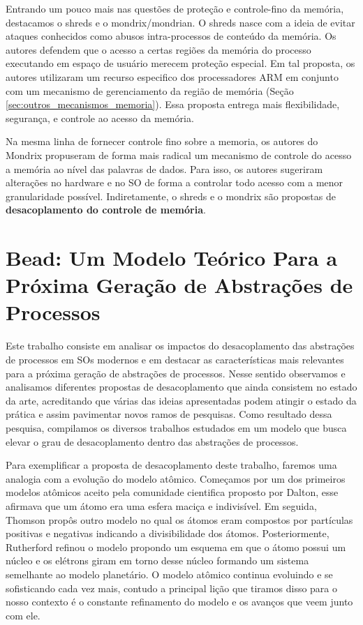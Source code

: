 Entrando um pouco mais nas questões de proteção e controle-fino da memória,
destacamos o shreds e o mondrix/mondrian. O shreds nasce com a ideia de evitar
ataques conhecidos como abusos intra-processos de conteúdo da memória.  Os
autores defendem que o acesso a certas regiões da memória do processo
executando em espaço de usuário merecem proteção especial. Em tal proposta, os
autores utilizaram um recurso especifico dos processadores ARM em conjunto com
um mecanismo de gerenciamento da região de memória (Seção
\ref{sec:outros_mecanismos_memoria}). Essa proposta entrega mais flexibilidade,
segurança, e controle ao acesso da memória.

Na mesma linha de fornecer controle fino sobre a memoria, os autores do Mondrix
propuseram de forma mais radical um mecanismo de controle do acesso a memória
ao nível das palavras de dados. Para isso, os autores sugeriram alterações no
hardware e no SO de forma a controlar todo acesso com a menor granularidade
possível. Indiretamente, o shreds e o mondrix são propostas de
\textbf{desacoplamento do controle de memória}.

\section{Bead: Um Modelo Teórico Para a Próxima Geração de Abstrações de Processos}

Este trabalho consiste em analisar os impactos do desacoplamento das abstrações
de processos em SOs modernos e em destacar as características mais relevantes
para a próxima geração de abstrações de processos. Nesse sentido observamos e
analisamos diferentes propostas de desacoplamento que ainda consistem no estado
da arte, acreditando que várias das ideias apresentadas podem atingir o estado
da prática e assim pavimentar novos ramos de pesquisas. Como resultado dessa
pesquisa, compilamos os diversos trabalhos estudados em um modelo que busca
elevar o grau de desacoplamento dentro das abstrações de processos.

Para exemplificar a proposta de desacoplamento deste trabalho, faremos uma
analogia com a evolução do modelo atômico. Começamos por um dos primeiros
modelos atômicos aceito pela comunidade cientifica proposto por Dalton, esse
afirmava que um átomo era uma esfera maciça e indivisível. Em seguida, Thomson
propôs outro modelo no qual os átomos eram compostos por partículas positivas e
negativas indicando a divisibilidade dos átomos.  Posteriormente, Rutherford
refinou o modelo propondo um esquema em que o átomo possui um núcleo e os
elétrons giram em torno desse núcleo formando um sistema semelhante ao modelo
planetário. O modelo atômico continua evoluindo e se sofisticando cada vez
mais, contudo a principal lição que tiramos disso para o nosso contexto é o
constante refinamento do modelo e os avanços que veem junto com ele.

